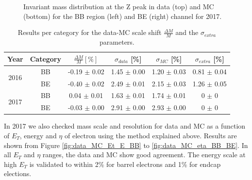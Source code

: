 \begin{figure}[ht]
\begin{center}
\begin{tabular}{cc}
    \end{tabular}
    \caption{Invariant mass distribution at the Z peak in data (top) and MC (bottom) for the BB region (left) and BE (right) channel for 2017.
    \label{fig:data_MC_peak_2017}}
  \end{center}
\end{figure}



\begin{table}[htb]
\begin{center}
\begin{tabular}{cccccc}
\hline
Year &Category            & $\frac{\Delta M}{M} [\%]$ & $\sigma_{data}$ [\%] & $\sigma_{MC}$ [\%] & $\sigma_{extra}$ [\%] \\ \hline
\multirow{2}{*}{2016}     &BB       & -0.19 $\pm$ 0.02          & 1.45 $\pm$ 0.00      & 1.20 $\pm$ 0.03    & 0.81 $\pm$ 0.04  \\
                          &BE       & -0.40 $\pm$ 0.02          & 2.49 $\pm$ 0.01      & 2.15 $\pm$ 0.03    & 1.26 $\pm$ 0.05  \\ \hline
\multirow{2}{*}{2017}     &BB       & 0.04 $\pm$ 0.01           & 1.63 $\pm$ 0.01      & 1.74 $\pm$ 0.01    & 0 $\pm$ 0 \\
                          &BE       & -0.03 $\pm$ 0.00          & 2.91 $\pm$ 0.00      & 2.93 $\pm$ 0.00    & 0 $\pm$ 0 \\ \hline
\end{tabular}
\caption{Results per category for the data-MC scale shift $\frac{\Delta M}{M}$ and the $\sigma_{extra}$ parameters. \label{tab:extra}}
\end{center}
\end{table}
\medskip


In 2017 we also checked mass scale and resolution for data and MC as a function of $E_{T}$, energy and $\eta$ of electron using the method explained above.
Results are shown from Figure \ref{fig:data_MC_Et_E_BB} to \ref{fig:data_MC_eta_BB_BE}. In all $E_{T}$ and  $\eta$ ranges, the data and MC show good agreement.
The energy scale at high $E_T$ is validated to within 2\% for barrel electrons and 1\% for endcap elections.

